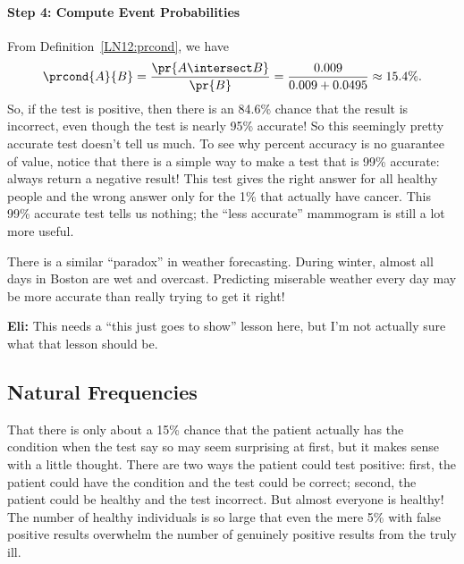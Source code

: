 \paragraph{Step 4: Compute Event Probabilities}

From Definition~\ref{LN12:prcond}, we have
\begin{equation*}
\prcond{A}{B}	= \frac{\pr{A \intersect B}}{\pr{B}} %
		= \frac{0.009}{0.009 + 0.0495} %
		\approx 15.4\%.
\end{equation*}
So, if the test is positive, then there is an 84.6\% chance that the
result is incorrect, even though the test is nearly 95\% accurate!  So
this seemingly pretty accurate test doesn't tell us much.  To see why
percent accuracy is no guarantee of value, notice that there is a
simple way to make a test that is 99\% accurate: always return a
negative result!  This test gives the right answer for all healthy
people and the wrong answer only for the 1\% that actually have
cancer.  This 99\% accurate test tells us nothing; the ``less
accurate'' mammogram is still a lot more useful.


\begin{editingnotes}
There is a similar ``paradox'' in weather forecasting.  During winter,
almost all days in Boston are wet and overcast.  Predicting miserable
weather every day may be more accurate than really trying to get it
right!
\end{editingnotes}


\begin{editingnotes}
\textbf{Eli:} This needs a ``this just goes to show'' lesson here, but
I'm not actually sure what that lesson should be.
\end{editingnotes}

\subsection{Natural Frequencies}

That there is only about a 15\% chance that the patient actually has
the condition when the test say so may seem surprising at first, but
it makes sense with a little thought.  There are two ways the patient
could test positive: first, the patient could have the condition and
the test could be correct; second, the patient could be healthy
and the test incorrect.  But almost everyone is healthy!  The number
of healthy individuals is so large that even the mere 5\% with false
positive results overwhelm the number of genuinely positive results
from the truly ill.

